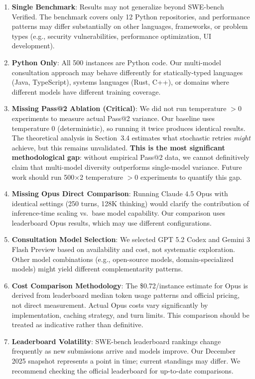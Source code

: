 \documentclass[11pt,a4paper]{article}
\begin{document}
\begin{enumerate}
    \item \textbf{Single Benchmark}: Results may not generalize beyond SWE-bench Verified. The benchmark covers only 12 Python repositories, and performance patterns may differ substantially on other languages, frameworks, or problem types (e.g., security vulnerabilities, performance optimization, UI development).
    
    \item \textbf{Python Only}: All 500 instances are Python code. Our multi-model consultation approach may behave differently for statically-typed languages (Java, TypeScript), systems languages (Rust, C++), or domains where different models have different training coverage.
    
    \item \textbf{Missing Pass@2 Ablation (Critical)}: We did not run temperature $> 0$ experiments to measure actual Pass@2 variance. Our baseline uses temperature 0 (deterministic), so running it twice produces identical results. The theoretical analysis in Section~3.4 estimates what stochastic retries \textit{might} achieve, but this remains unvalidated. \textbf{This is the most significant methodological gap}: without empirical Pass@2 data, we cannot definitively claim that multi-model diversity outperforms single-model variance. Future work should run 500$\times$2 temperature $> 0$ experiments to quantify this gap.
    
    \item \textbf{Missing Opus Direct Comparison}: Running Claude 4.5 Opus with identical settings (250 turns, 128K thinking) would clarify the contribution of inference-time scaling vs.\ base model capability. Our comparison uses leaderboard Opus results, which may use different configurations.
    
    \item \textbf{Consultation Model Selection}: We selected GPT 5.2 Codex and Gemini 3 Flash Preview based on availability and cost, not systematic exploration. Other model combinations (e.g., open-source models, domain-specialized models) might yield different complementarity patterns.
    
    \item \textbf{Cost Comparison Methodology}: The \$0.72/instance estimate for Opus is derived from leaderboard median token usage patterns and official pricing, not direct measurement. Actual Opus costs vary significantly by implementation, caching strategy, and turn limits. This comparison should be treated as indicative rather than definitive.
    
    \item \textbf{Leaderboard Volatility}: SWE-bench leaderboard rankings change frequently as new submissions arrive and models improve. Our December 2025 snapshot represents a point in time; current standings may differ. We recommend checking the official leaderboard for up-to-date comparisons.
\end{enumerate}
\end{document}
